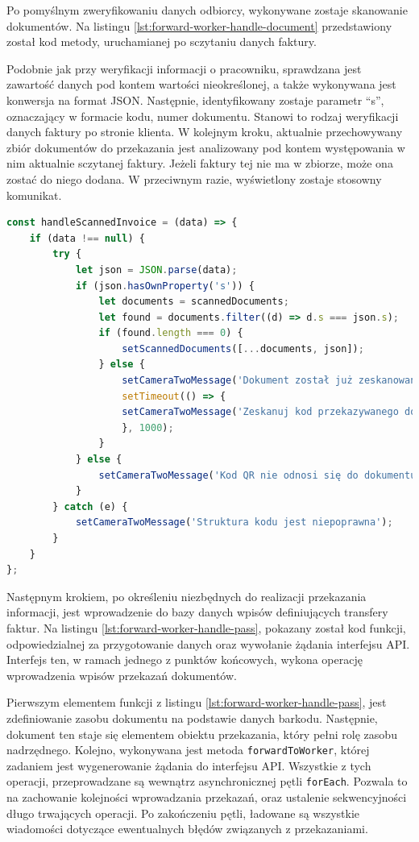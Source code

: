 Po pomyślnym zweryfikowaniu danych odbiorcy, wykonywane zostaje skanowanie dokumentów. Na listingu \ref{lst:forward-worker-handle-document} przedstawiony został kod metody, uruchamianej po sczytaniu danych faktury.

Podobnie jak przy weryfikacji informacji o pracowniku, sprawdzana jest zawartość danych pod kontem wartości nieokreślonej, a także wykonywana jest konwersja na format JSON. Następnie, identyfikowany zostaje parametr "`s"', oznaczający w formacie kodu, numer dokumentu. Stanowi to rodzaj weryfikacji danych faktury po stronie klienta. W kolejnym kroku, aktualnie przechowywany zbiór dokumentów do przekazania jest analizowany pod kontem występowania w nim aktualnie sczytanej faktury. Jeżeli faktury tej nie ma w zbiorze, może ona zostać do niego dodana. W przeciwnym razie, wyświetlony zostaje stosowny komunikat.

\begin{lstlisting}[label=lst:forward-worker-handle-document,caption=Kod funkcji wykonywanej po zeskanowaniu barkodu dokumentu, captionpos=b,basicstyle=\footnotesize\ttfamily,language=JavaScript]
const handleScannedInvoice = (data) => {
	if (data !== null) {
		try {
			let json = JSON.parse(data);
			if (json.hasOwnProperty('s')) {
				let documents = scannedDocuments;
				let found = documents.filter((d) => d.s === json.s);
				if (found.length === 0) {
					setScannedDocuments([...documents, json]);
				} else {
					setCameraTwoMessage('Dokument został już zeskanowany');
					setTimeout(() => {
					setCameraTwoMessage('Zeskanuj kod przekazywanego dokumentu');
					}, 1000);
				}
			} else {
				setCameraTwoMessage('Kod QR nie odnosi się do dokumentu');
			}
		} catch (e) {
			setCameraTwoMessage('Struktura kodu jest niepoprawna');
		}
	}
};
\end{lstlisting}

Następnym krokiem, po określeniu niezbędnych do realizacji przekazania informacji, jest wprowadzenie do bazy danych wpisów definiujących transfery faktur. Na listingu \ref{lst:forward-worker-handle-pass}, pokazany został kod funkcji, odpowiedzialnej za przygotowanie danych oraz wywołanie żądania interfejsu API. Interfejs ten, w ramach jednego z punktów końcowych, wykona operację wprowadzenia wpisów przekazań dokumentów.

Pierwszym elementem funkcji z listingu \ref{lst:forward-worker-handle-pass}, jest zdefiniowanie zasobu dokumentu na podstawie danych barkodu. Następnie, dokument ten staje się elementem obiektu przekazania, który pełni rolę zasobu nadrzędnego. Kolejno, wykonywana jest metoda \texttt{forwardToWorker}, której zadaniem jest wygenerowanie żądania do interfejsu API. Wszystkie z tych operacji, przeprowadzane są wewnątrz asynchronicznej pętli \texttt{forEach}. Pozwala to na zachowanie kolejności wprowadzania przekazań, oraz ustalenie sekwencyjności długo trwających operacji. Po zakończeniu pętli, ładowane są wszystkie wiadomości dotyczące ewentualnych błędów związanych z przekazaniami.

